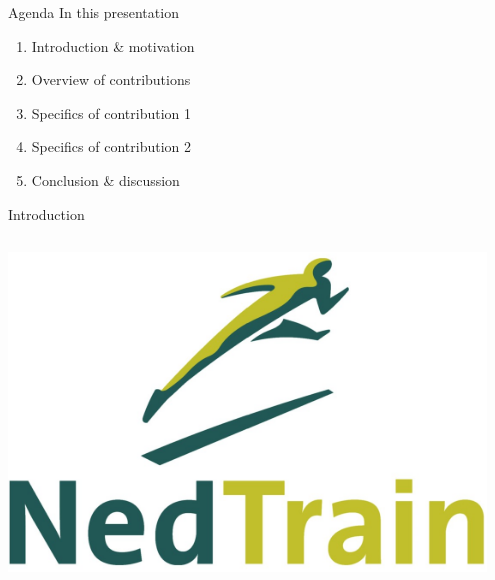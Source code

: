 \begin{frame}{Agenda}
	In this presentation
	\begin{enumerate}
		\item Introduction \& motivation
		\item Overview of contributions
		\item Specifics of contribution 1
		\item Specifics of contribution 2
		\item Conclusion \& discussion
	\end{enumerate}
\end{frame}

\begin{frame}{Introduction}
	\begin{columns}

		\includegraphics[width=0.95\textwidth]{../delft-style/title/logos/nedtrain}

		\bigskip


\end{columns}
\end{frame}

